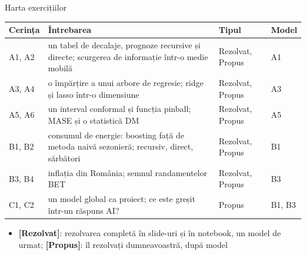 \begin{frame}{Harta exercițiilor}
\itemsize{\small}
\begin{center}
\footnotesize
\begin{tabular}{>{\raggedright\arraybackslash}p{1.1cm}>{\raggedright\arraybackslash}p{7.5cm}>{\raggedright\arraybackslash}p{1.9cm}>{\raggedright\arraybackslash}p{1.4cm}}
\toprule
\textbf{Cerința} & \textbf{Întrebarea} & \textbf{Tipul} & \textbf{Model} \\
\midrule
A1, A2 & un tabel de decalaje, prognoze recursive și directe; scurgerea de informație într-o medie mobilă & Rezolvat, Propus & A1 \\
A3, A4 & o împărțire a unui arbore de regresie; ridge și lasso într-o dimensiune & Rezolvat, Propus & A3 \\
A5, A6 & un interval conformal și funcția pinball; MASE și o statistică DM & Rezolvat, Propus & A5 \\
B1, B2 & consumul de energie: boosting față de metoda naivă sezonieră; recursiv, direct, sărbători & Rezolvat, Propus & B1 \\
B3, B4 & inflația din România; semnul randamentelor BET & Rezolvat, Propus & B3 \\
C1, C2 & un model global ca proiect; ce este greșit într-un răspuns AI? & Propus & B1, B3 \\
\bottomrule
\end{tabular}
\end{center}
\begin{itemize}
    \item \textbf{[Rezolvat]}: rezolvarea completă în slide-uri și în notebook, un model de urmat; \textbf{[Propus]}: îl rezolvați dumneavoastră, după model
\end{itemize}
\end{frame}

